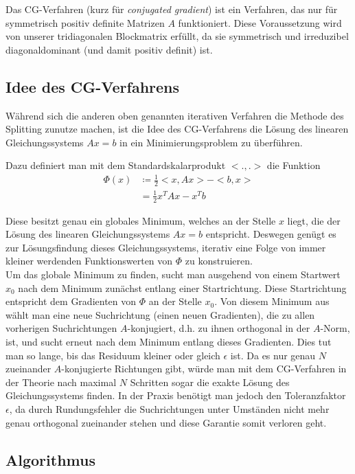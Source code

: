 \documentclass{scrartcl}
\begin{document}
Das CG-Verfahren (kurz für \textit{conjugated gradient}) ist ein Verfahren, das nur für symmetrisch positiv definite Matrizen $A$ funktioniert.
Diese Voraussetzung wird von unserer tridiagonalen Blockmatrix erfüllt, da sie symmetrisch und irreduzibel diagonaldominant (und damit positiv definit) ist.

\subsection{Idee des CG-Verfahrens}

Während sich die anderen oben genannten iterativen Verfahren die Methode des Splitting zunutze machen, ist die Idee des CG-Verfahrens die Lösung des linearen Gleichungssystems $Ax=b$ in ein Minimierungsproblem zu überführen.

Dazu definiert man mit dem Standardskalarprodukt $<.,.>$ die Funktion
\begin{align*}
  \Phi (x) &\coloneqq \frac{1}{2}<x,Ax> - <b,x>\\
           &=\frac{1}{2}x^T Ax - x^T b
\end{align*}

Diese besitzt genau ein globales Minimum, welches an der Stelle $x$ liegt, die der Lösung des linearen Gleichungssystems $Ax=b$ entspricht. Deswegen genügt es zur Lösungsfindung dieses Gleichungssystems, iterativ eine Folge von immer kleiner werdenden Funktionswerten von $\Phi$ zu konstruieren.\\
Um das globale Minimum zu finden, sucht man ausgehend von einem Startwert $x_0$ nach dem Minimum zunächst entlang einer Startrichtung. Diese Startrichtung entspricht dem Gradienten von $\Phi$ an der Stelle $x_0$.
Von diesem Minimum aus wählt man eine neue Suchrichtung (einen neuen Gradienten), die zu allen vorherigen Suchrichtungen $A$-konjugiert, d.h. zu ihnen orthogonal in der $A$-Norm, ist, und sucht erneut nach dem Minimum entlang dieses Gradienten.
Dies tut man so lange, bis das Residuum kleiner oder gleich $\epsilon$ ist.
Da es nur genau $N$ zueinander $A$-konjugierte Richtungen gibt, würde man mit dem CG-Verfahren in der Theorie nach maximal $N$ Schritten sogar die exakte Lösung des Gleichungssystems finden.
In der Praxis benötigt man jedoch den Toleranzfaktor $\epsilon$, da durch Rundungsfehler die Suchrichtungen unter Umständen nicht mehr genau orthogonal zueinander stehen und diese Garantie somit verloren geht.\\

\subsection{Algorithmus}
\end{document}
